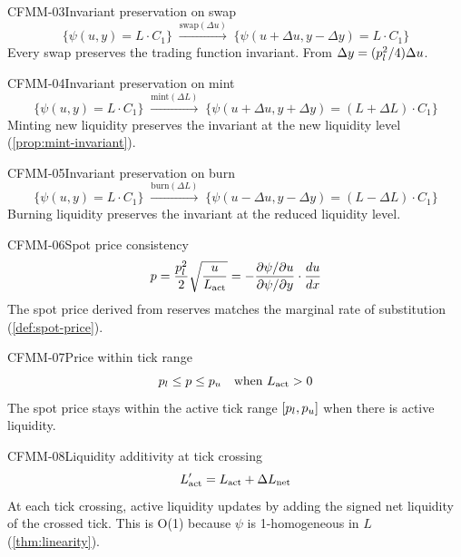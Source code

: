 \begin{invariant}{CFMM-03}{Invariant preservation on swap}
\[
  \{\psi(u, y) = L \cdot C_1\}
  \;\xrightarrow{\text{swap}(\Delta u)}\;
  \{\psi(u + \Delta u, y - \Delta y) = L \cdot C_1\}
\]
Every swap preserves the trading function invariant. From $\Delta y = (p_l^2/4)\Delta u$.
\end{invariant}

\begin{invariant}{CFMM-04}{Invariant preservation on mint}
\[
  \{\psi(u, y) = L \cdot C_1\}
  \;\xrightarrow{\text{mint}(\Delta L)}\;
  \{\psi(u + \Delta u, y + \Delta y) = (L + \Delta L) \cdot C_1\}
\]
Minting new liquidity preserves the invariant at the new liquidity level
(\cref{prop:mint-invariant}).
\end{invariant}

\begin{invariant}{CFMM-05}{Invariant preservation on burn}
\[
  \{\psi(u, y) = L \cdot C_1\}
  \;\xrightarrow{\text{burn}(\Delta L)}\;
  \{\psi(u - \Delta u, y - \Delta y) = (L - \Delta L) \cdot C_1\}
\]
Burning liquidity preserves the invariant at the reduced liquidity level.
\end{invariant}

\begin{invariant}{CFMM-06}{Spot price consistency}
\[
  p = \frac{p_l^2}{2}\sqrt{\frac{u}{L_{\text{act}}}}
  = -\frac{\partial\psi/\partial u}{\partial\psi/\partial y} \cdot \frac{du}{dx}
\]
The spot price derived from reserves matches the marginal rate of substitution
(\cref{def:spot-price}).
\end{invariant}

\begin{invariant}{CFMM-07}{Price within tick range}
\[
  p_l \leq p \leq p_u \quad\text{when } L_{\text{act}} > 0
\]
The spot price stays within the active tick range $[p_l, p_u]$
when there is active liquidity.
\end{invariant}

\begin{invariant}{CFMM-08}{Liquidity additivity at tick crossing}
\[
  L_{\text{act}}' = L_{\text{act}} + \Delta L_{\text{net}}
\]
At each tick crossing, active liquidity updates by adding the signed net liquidity
of the crossed tick. This is O(1) because $\psi$ is 1-homogeneous in $L$
(\cref{thm:linearity}).
\end{invariant}

